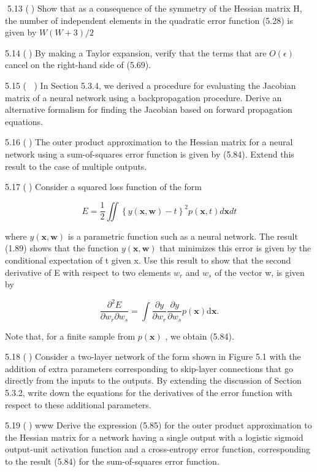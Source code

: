 \documentclass[
  10
]{article}
\begin{document}
5.13 () Show that as a consequence of the symmetry of the Hessian matrix
H, the number of independent elements in the quadratic error function
(5.28) is given by \(W ( W + 3 ) / 2\)

5.14 () By making a Taylor expansion, verify that the terms that are
\(O ( \epsilon )\) cancel on the right-hand side of (5.69).

5.15 ( ) In Section 5.3.4, we derived a procedure for evaluating the
Jacobian matrix of a neural network using a backpropagation procedure.
Derive an alternative formalism for finding the Jacobian based on
forward propagation equations.

5.16 () The outer product approximation to the Hessian matrix for a
neural network using a sum-of-squares error function is given by (5.84).
Extend this result to the case of multiple outputs.

5.17 () Consider a squared loss function of the form

\[
E = \frac {1}{2} \iint \left\{y (\mathbf {x}, \mathbf {w}) - t \right\} ^ {2} p (\mathbf {x}, t) d \mathbf {x} d t\tag{5.193}
\]

where \(y ( \mathbf { x } , \mathbf { w } )\) is a parametric function
such as a neural network. The result (1.89) shows that the function
\(y ( \mathbf { x } , \mathbf { w } )\) that minimizes this error is
given by the conditional expectation of t given x. Use this result to
show that the second derivative of E with respect to two elements
\(w _ { r }\) and \(w _ { s }\) of the vector w, is given by

\[
\frac {\partial^ {2} E}{\partial w _ {r} \partial w _ {s}} = \int \frac {\partial y}{\partial w _ {r}} \frac {\partial y}{\partial w _ {s}} p (\mathbf {x}) \mathrm{d} \mathbf {x}.\tag{5.194}
\]

Note that, for a finite sample from \(p ( \mathbf { x } )\) , we obtain
(5.84).

5.18 () Consider a two-layer network of the form shown in Figure 5.1
with the addition of extra parameters corresponding to skip-layer
connections that go directly from the inputs to the outputs. By
extending the discussion of Section 5.3.2, write down the equations for
the derivatives of the error function with respect to these additional
parameters.

5.19 () www Derive the expression (5.85) for the outer product
approximation to the Hessian matrix for a network having a single output
with a logistic sigmoid output-unit activation function and a
cross-entropy error function, corresponding to the result (5.84) for the
sum-of-squares error function.
\end{document}
